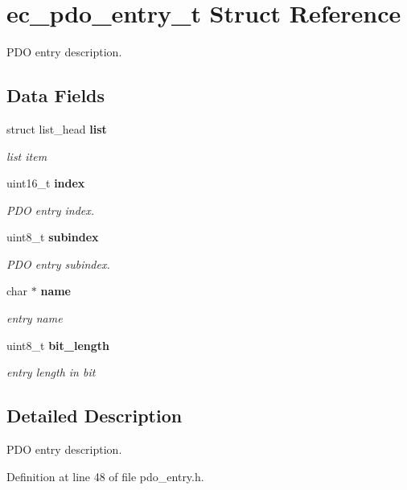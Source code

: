 \section{ec\-\_\-pdo\-\_\-entry\-\_\-t Struct Reference}
\label{structec__pdo__entry__t}


P\-D\-O entry description.  


\subsection*{Data Fields}
\begin{DoxyCompactItemize}
\item 
struct list\-\_\-head {\bf list}\label{structec__pdo__entry__t_a0d810c566b51deaff1d6de9c59230ae4}

\begin{DoxyCompactList}\small\item\em list item \end{DoxyCompactList}\item 
uint16\-\_\-t {\bf index}\label{structec__pdo__entry__t_aede0b110f1a6f0e0df05081c85b14bf0}

\begin{DoxyCompactList}\small\item\em P\-D\-O entry index. \end{DoxyCompactList}\item 
uint8\-\_\-t {\bf subindex}\label{structec__pdo__entry__t_a959b16d415fbbb08a4997d858465a3be}

\begin{DoxyCompactList}\small\item\em P\-D\-O entry subindex. \end{DoxyCompactList}\item 
char $\ast$ {\bf name}\label{structec__pdo__entry__t_ac3ccd6c6e8f8dfa934737dd18f456ee5}

\begin{DoxyCompactList}\small\item\em entry name \end{DoxyCompactList}\item 
uint8\-\_\-t {\bf bit\-\_\-length}\label{structec__pdo__entry__t_a589e58c4f0eb47d8916a3da125d09176}

\begin{DoxyCompactList}\small\item\em entry length in bit \end{DoxyCompactList}\end{DoxyCompactItemize}


\subsection{Detailed Description}
P\-D\-O entry description. 

Definition at line 48 of file pdo\-\_\-entry.\-h.

